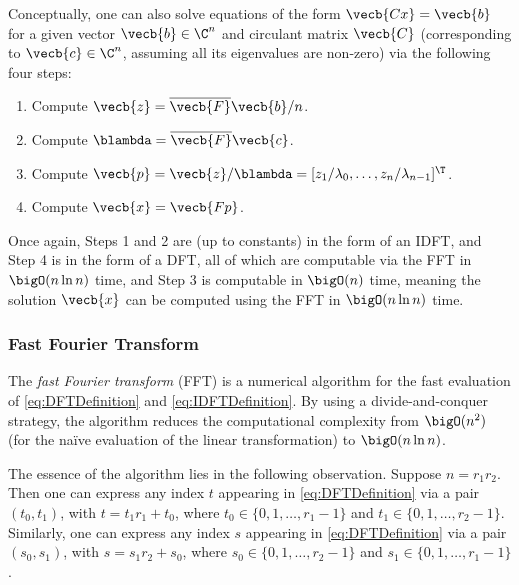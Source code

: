 Conceptually, one can also solve equations of the form $\vecb{Cx} = \vecb{b}$ for a given vector $\vecb{b} \in \C^n$ and circulant matrix $\vecb{C}$ (corresponding to $\vecb{c} \in \C^n$, assuming all its eigenvalues are non-zero) via the following four steps:
\begin{enumerate}
	\item Compute $\vecb{z} = \overline{\vecb{F}} \vecb{b} / n$.
	\item Compute $\blambda = \overline{\vecb{F}} \vecb{c}$.
	\item Compute $\vecb{p} = \vecb{z} / \blambda = [z_1 / \lambda_0, \dots, z_n / \lambda_{n-1}]^\T$.
	\item Compute $\vecb{x} = \vecb{Fp}$.
\end{enumerate}
Once again, Steps 1 and 2 are (up to constants) in the form of an IDFT, and Step 4 is in the form of a DFT, all of which are computable via the FFT in $\bigO(n \ln n)$ time, and Step 3 is computable in $\bigO(n)$ time, meaning the solution $\vecb{x}$ can be computed using the FFT in $\bigO(n \ln n)$ time.

\subsubsection{Fast Fourier Transform}
The \textit{fast Fourier transform} (FFT) is a numerical algorithm for the fast evaluation of \eqref{eq:DFTDefinition} and \eqref{eq:IDFTDefinition}. By using a divide-and-conquer strategy, the algorithm reduces the computational complexity from $\bigO(n^2)$ (for the naïve evaluation of the linear transformation) to $\bigO(n \ln n)$.

The essence of the algorithm lies in the following observation. Suppose $n = r_1 r_2$. Then one can express any index $t$ appearing in \eqref{eq:DFTDefinition} via a pair $(t_0, t_1)$, with $t = t_1 r_1 + t_0$, where $t_0 \in \{0, 1, \dots, r_1 - 1\}$ and $t_1 \in \{0, 1, \dots, r_2 - 1\}$. Similarly, one can express any index $s$ appearing in \eqref{eq:DFTDefinition} via a pair $(s_0, s_1)$, with $s = s_1 r_2 + s_0$, where $s_0 \in \{0, 1, \dots, r_2 - 1\}$ and $s_1 \in \{0, 1, \dots, r_1 - 1\}$.

